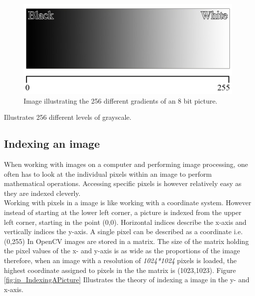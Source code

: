 \begin{figure}[htbp]
\centering
\includegraphics[width=1.00\textwidth]{Pictures/Theory/Grayscale.jpg}
\caption{Image illustrating the 256 different gradients of an 8 bit picture.}
\label{fig:ip_grayscale}
\end{figure}
 Illustrates 256 different levels of grayscale.\\

 
\subsection{Indexing an image}
When working with images on a computer and performing image processing, one often has to look at the individual pixels within an image to perform mathematical operations. Accessing specific pixels is however relatively easy as they are indexed cleverly.\\
Working with pixels in a image is like working with a coordinate system. However instead of starting at the lower left corner, a picture is indexed from the upper left corner, starting in the point (0,0). Horizontal indices describe the x-axis and vertically indices the y-axis. A single pixel can be described as a coordinate i.e. (0,255)  In OpenCV images are stored in a matrix. The size of the matrix holding the pixel values of the x- and y-axis is as wide as the proportions of the image therefore, when an image with a resolution of \textit{1024*1024} pixels is loaded, the highest coordinate assigned to pixels in the the matrix is (1023,1023). Figure \eqref{fig:ip_IndexingAPicture} Illustrates the theory of indexing a image in the y- and x-axis.\\

